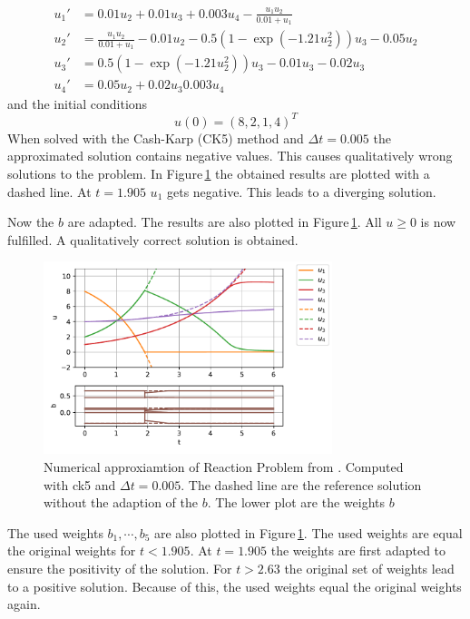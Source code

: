 \documentclass[a4paper]{scrartcl}
\numberwithin{equation}{section}
\theoremstyle{plain}
\theoremstyle{definition}
\numberwithin{theorem}{section}
\newcommand{\dt}{{\Delta t}}
\newcommand{\1}{\mathbbm{1}}
\begin{document}
\begin{subequations}
\label{eq:Reaction}
\begin{align}
u_1' &= 0.01u_2 + 0.01 u_3 +0.003u_4 - \frac{u_1 u_2}{0.01+u_1} \\ 
u_2' &= \frac{u_1u_2}{0.01+u_1}-0.01 u_2-0.5(1-\exp(-1.21 u_2^2)) u_3 -0.05 u_2 \\ 
u_3' &= 0.5(1-\exp(-1.21u_2^2)) u_3 - 0.01 u_3 -0.02 u_3 \\ 
u_4' &=0.05 u_2 + 0.02 u_3 0.003u_4 
\end{align}
\end{subequations}
and the initial conditions
\begin{equation}
u(0) = (8,2,1,4)^T
\end{equation}
When solved with the Cash-Karp (CK5) method and $\dt = 0.005$ the approximated solution contains negative values. This causes qualitatively wrong solutions to the problem. 
In Figure\,\ref{fig:exampleI} the obtained results are plotted with a dashed line. 
At $t=1.905$ $u_1$ gets negative. This leads to a diverging solution.

Now the $b$ are adapted. The results are also plotted in Figure\,\ref{fig:exampleI}. 
All $u\geq0$ is now fulfilled. A qualitatively correct solution is obtained.

\begin{figure}[h]
    \centering
    \includegraphics[width=0.75\textwidth]{plots/exampleI.pdf}
    \caption{Numerical approxiamtion of Reaction Problem from \cite{kopecz_comparison_2019}. Computed with ck5 and $\dt = 0.005$. The dashed line are the reference solution without the adaption of the $b$. The lower plot are the weights $b$ }
    \label{fig:exampleI}
\end{figure}

The used weights $b_1,\cdots,b_5$ are also plotted in Figure\,\ref{fig:exampleI}. 
The used weights are equal the original weights for $t<1.905$. At $t=1.905$ the weights are first adapted to ensure the positivity of the solution. For $t>2.63$ the original set of weights lead to a positive solution. Because of this, the used weights equal the original weights again.
\end{document}

